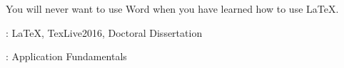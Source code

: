 \noindent You will never want to use Word when you have learned how to use \LaTeX.

\vspace{\baselineskip}
{ \hangindent=69.6pt
	: \LaTeX, TexLive2016, Doctoral Dissertation

	\vspace{\baselineskip}
	: Application Fundamentals
}

\clearpage
